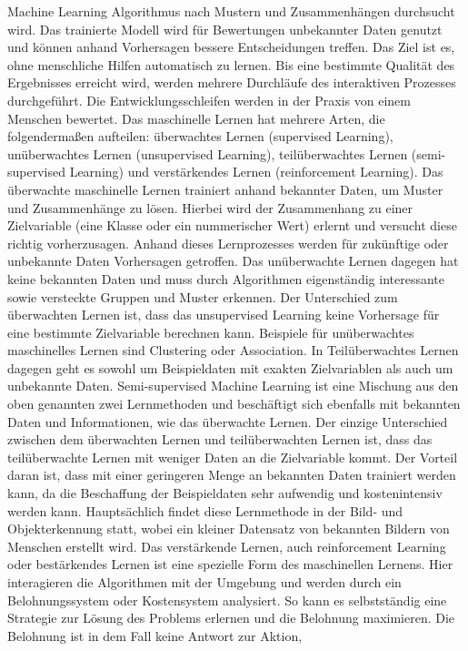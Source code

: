 Machine Learning Algorithmus nach Mustern und Zusammenhängen durchsucht wird. Das trainierte Modell wird für Bewertungen unbekannter Daten genutzt und können 
anhand Vorhersagen bessere Entscheidungen treffen. Das Ziel ist es, ohne menschliche Hilfen automatisch zu lernen. Bis eine bestimmte Qualität des Ergebnisses 
erreicht wird, werden mehrere Durchläufe des interaktiven Prozesses durchgeführt. Die Entwicklungsschleifen werden in der Praxis von einem Menschen bewertet.
Das maschinelle Lernen hat mehrere Arten, die folgendermaßen aufteilen: überwachtes Lernen (supervised Learning), unüberwachtes Lernen (unsupervised Learning), 
teilüberwachtes Lernen (semi-supervised Learning) und verstärkendes Lernen (reinforcement Learning). Das überwachte maschinelle Lernen trainiert anhand bekannter 
Daten, um Muster und Zusammenhänge zu lösen. Hierbei wird der Zusammenhang zu einer Zielvariable (eine Klasse oder ein nummerischer Wert) erlernt und versucht diese 
richtig vorherzusagen. Anhand dieses Lernprozesses werden für zukünftige oder unbekannte Daten Vorhersagen getroffen. Das unüberwachte Lernen dagegen hat keine 
bekannten Daten und muss durch Algorithmen eigenständig interessante sowie versteckte Gruppen und Muster erkennen. Der Unterschied zum überwachten Lernen ist, dass 
das unsupervised Learning keine Vorhersage für eine bestimmte Zielvariable berechnen kann. Beispiele für unüberwachtes maschinelles Lernen 
sind Clustering oder Association. In Teilüberwachtes Lernen dagegen geht es sowohl um Beispieldaten mit exakten Zielvariablen als auch um unbekannte Daten. 
Semi-supervised Machine Learning ist eine Mischung aus den oben genannten zwei Lernmethoden und beschäftigt sich ebenfalls mit bekannten Daten und Informationen, 
wie das überwachte Lernen. Der einzige Unterschied zwischen dem überwachten Lernen und teilüberwachten Lernen ist, dass das teilüberwachte Lernen mit weniger 
Daten an die Zielvariable kommt. Der Vorteil daran ist, dass mit einer geringeren Menge an bekannten Daten trainiert werden kann, da die Beschaffung 
der Beispieldaten sehr aufwendig und kostenintensiv werden kann. Hauptsächlich findet diese Lernmethode in der Bild- und Objekterkennung statt, wobei ein 
kleiner Datensatz von bekannten Bildern von Menschen erstellt wird. Das verstärkende Lernen, auch reinforcement Learning oder bestärkendes Lernen ist eine spezielle 
Form des maschinellen Lernens. Hier interagieren die Algorithmen mit der Umgebung und werden durch ein Belohnungssystem oder Kostensystem analysiert. 
So kann es selbstständig eine Strategie zur Lösung des Problems erlernen und die Belohnung maximieren. Die Belohnung ist in dem Fall keine Antwort zur Aktion, 
